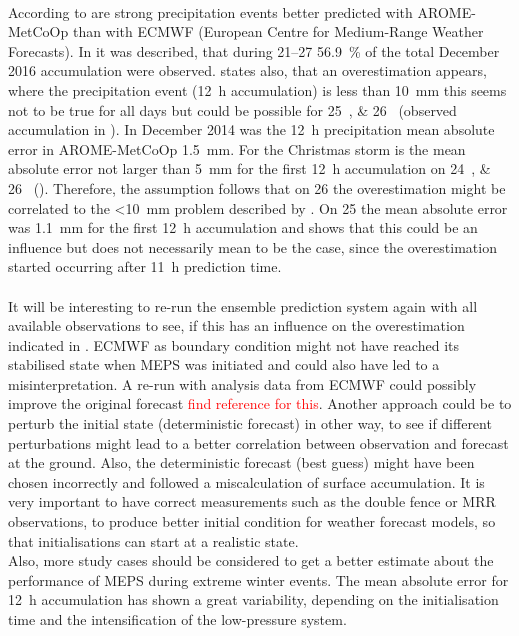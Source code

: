 \\
According to \citet{muller_arome-metcoop:_2017} are strong precipitation events better predicted with AROME-MetCoOp than with ECMWF (European Centre for Medium-Range Weather Forecasts). In  it was described, that during \SIrange{21}{27}{\dec} \SI{56.9}{\percent} of the total December 2016 accumulation were observed. \citet{muller_arome-metcoop:_2017} states also, that an overestimation appears, where the precipitation event (\SI{12}{\hour} accumulation) is less than \SI{10}{\mm} this seems not to be true for all days but could be possible for \SIlist{25;26}{\dec} (observed accumulation in ). In December 2014 was the \SI{12}{\hour} precipitation mean absolute error in AROME-MetCoOp \SI{1.5}{\mm}. For the Christmas storm is the mean absolute error not larger than \SI{5}{\mm} for the first \SI{12}{\hour} accumulation on \SIlist{24;26}{\dec} (). Therefore, the assumption follows that on \SI{26}{\dec} the overestimation might be correlated to the <\SI{10}{\mm} problem described by \citet{muller_arome-metcoop:_2017}. On \SI{25}{\dec} the mean absolute error was \SI{1.1}{\mm} for the first \SI{12}{\hour} accumulation and shows that this could be an influence but does not necessarily mean to be the case, since the overestimation started occurring after \SI{11}{\hour} prediction time. 
\\
\\
It will be interesting to re-run the ensemble prediction system again with all available observations to see, if this has an influence on the overestimation indicated in . ECMWF as boundary condition might not have reached its stabilised state when MEPS was initiated and could also have led to a misinterpretation. A re-run with analysis data from ECMWF could possibly improve the original forecast \textcolor{red}{find reference for this}. 
Another approach could be to perturb the initial state (deterministic forecast) in other way, to see if different perturbations might lead to a better correlation between observation and forecast at the ground. Also, the deterministic forecast (best guess) might have been chosen incorrectly and followed a miscalculation of surface accumulation.
It is very important to have correct measurements such as the double fence or MRR observations, to produce better initial condition for weather forecast models, so that initialisations can start at a realistic state.
\\
Also, more study cases should be considered to get a better estimate about the performance of MEPS during extreme winter events. The mean absolute error for \SI{12}{\hour} accumulation has shown a great variability, depending on the initialisation time and the intensification of the low-pressure system.  



